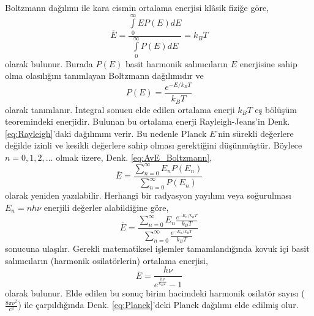 \documentclass[00_kitap.tex]{subfiles}
\begin{document}
Boltzmann dağılımı ile kara cismin ortalama enerjisi klâsik fiziğe göre,
\begin{equation}
\label{eq:AvE_Boltzmann}
\overline E =\frac{\int \limits_0^\infty E P(E) dE}{\int \limits_0^\infty P(E) dE} = k_B T
\end{equation} 
olarak bulunur. Burada $P(E)$ basit harmonik salınıcıların $E$ enerjisine sahip olma olasılığını tanımlayan Boltzmann dağılımıdır ve
\begin{equation}
\label{eq:Boltzmann}
P(E) = \frac{e^{-E/k_BT}}{k_BT}
\end{equation} 
olarak tanımlanır. İntegral sonucu elde edilen ortalama enerji $k_B T$ eş bölüşüm teoremindeki enerjidir. Bulunan bu ortalama enerji Rayleigh-Jeans'in Denk. \ref{eq:Rayleigh}'daki dağılımını verir. Bu nedenle Planck $E$'nin sürekli değerlere değilde izinli ve kesikli değerlere sahip olması gerektiğini düşünmüştür. Böylece $n = 0, 1, 2, \dots$  olmak üzere, Denk. \ref{eq:AvE_Boltzmann},
\begin{equation}
\label{eq:Boltzmann_Planck}
\overline E =\frac{\sum \limits_{n=0}^\infty E_n P(E_n)}{\sum \limits_{n=0}^\infty P(E_n)} 
\end{equation}
olarak yeniden yazılabilir. Herhangi bir radyasyon yayılımı veya soğurulması $E_n=n h\nu$ enerjili değerler alabildiğine göre,
\begin{equation}
\label{eq:Boltzmann_Planck}
\overline E =\frac{\sum \limits_{n=0}^\infty E_n \frac{e^{-E_n/k_BT}}{k_BT}}{\sum \limits_{n=0}^\infty \frac{e^{-E_n/k_BT}}{k_BT}} 
\end{equation}
sonucuna ulaşılır. Gerekli matematiksel işlemler tamamlandığında \cite{book:EisbergResnick} kovuk içi basit salınıcıların (harmonik osilatörlerin) ortalama enerjisi,
\begin{equation}
\label{eq:Planck_Av_E}
\overline E = \frac{h\nu}{e^{\frac{h \nu}{k_{B} T}} - 1}
\end{equation}
olarak bulunur. Elde edilen bu sonuç birim hacimdeki harmonik osilatör sayısı ($\frac{8 \pi \nu^{2}}{c^{3}}$) ile çarpıldığında Denk. \ref{eq:Planck}'deki Planck dağılımı elde edilmiş olur. 
\end{document}
